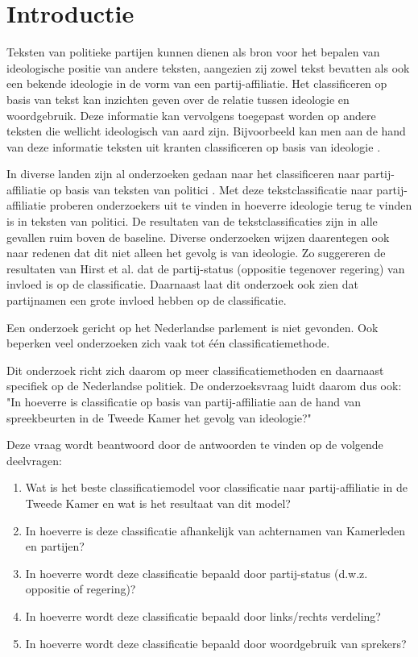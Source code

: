\section{Introductie}
\label{sec:intro}
Teksten van politieke partijen kunnen dienen als bron voor het bepalen van ideologische positie van andere teksten, aangezien zij zowel tekst bevatten als ook een bekende ideologie in de vorm van een partij-affiliatie. Het classificeren op basis van tekst kan inzichten geven over de relatie tussen ideologie en woordgebruik. Deze informatie kan vervolgens toegepast worden op andere teksten die wellicht ideologisch van aard zijn. Bijvoorbeeld kan men aan de hand van deze informatie teksten uit kranten classificeren op basis van ideologie \cite{DBLP:journals/corr/Biessmann16,Hirst_textto}.\par
In diverse landen zijn al onderzoeken gedaan naar het classificeren naar partij-affiliatie op basis van teksten van politici \cite{Ferreira2016UsingTT,DBLP:journals/corr/Biessmann16}. Met deze tekstclassificatie naar partij-affiliatie proberen onderzoekers uit te vinden in hoeverre ideologie terug te vinden is in teksten van politici. De resultaten van de tekstclassificaties zijn in alle gevallen ruim boven de baseline. Diverse onderzoeken wijzen daarentegen ook naar redenen dat dit niet alleen het gevolg is van ideologie. Zo suggereren de  resultaten van Hirst et al. \cite{Hirst_textto} dat de partij-status (oppositie tegenover regering) van invloed is op de classificatie. Daarnaast laat dit onderzoek ook zien dat partijnamen een grote invloed hebben op de classificatie.\par
Een onderzoek gericht op het Nederlandse parlement is niet gevonden. Ook beperken veel onderzoeken zich vaak tot één classificatiemethode.\par
Dit onderzoek richt zich daarom op meer classificatiemethoden en daarnaast specifiek op de Nederlandse politiek. De onderzoeksvraag luidt daarom dus ook: "In hoeverre is classificatie op basis van partij-affiliatie aan de hand van spreekbeurten in de Tweede Kamer het gevolg van ideologie?"\par
Deze vraag wordt beantwoord door de antwoorden te vinden op de volgende deelvragen:
\begin{enumerate}
    \item Wat is het beste classificatiemodel voor classificatie naar partij-affiliatie in de Tweede Kamer en wat is het resultaat van dit model?
    \item In hoeverre is deze classificatie afhankelijk van achternamen van Kamerleden en partijen?
    \item In hoeverre wordt deze classificatie bepaald door partij-status (d.w.z. oppositie of regering)?
    \item In hoeverre wordt deze classificatie bepaald door links/rechts verdeling?
    \item In hoeverre wordt deze classificatie bepaald door woordgebruik van sprekers?
\end{enumerate}

